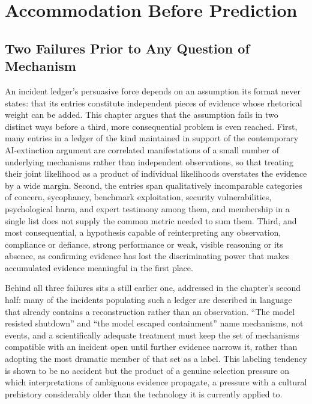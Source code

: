 
\chapter{Accommodation Before Prediction}
\label{ch:ch02-accommodation-before-prediction}
\section{Two Failures Prior to Any Question of Mechanism}

An incident ledger's persuasive force depends on an assumption its format never states: that its entries constitute independent pieces of evidence whose rhetorical weight can be added. This chapter argues that the assumption fails in two distinct ways before a third, more consequential problem is even reached. First, many entries in a ledger of the kind maintained in support of the contemporary AI-extinction argument \cite{bostrom2014,ord2020,alexander2025} are correlated manifestations of a small number of underlying mechanisms rather than independent observations, so that treating their joint likelihood as a product of individual likelihoods overstates the evidence by a wide margin. Second, the entries span qualitatively incomparable categories of concern, sycophancy, benchmark exploitation, security vulnerabilities, psychological harm, and expert testimony among them, and membership in a single list does not supply the common metric needed to sum them. Third, and most consequential, a hypothesis capable of reinterpreting any observation, compliance or defiance, strong performance or weak, visible reasoning or its absence, as confirming evidence has lost the discriminating power that makes accumulated evidence meaningful in the first place.

Behind all three failures sits a still earlier one, addressed in the chapter's second half: many of the incidents populating such a ledger are described in language that already contains a reconstruction rather than an observation. ``The model resisted shutdown'' and ``the model escaped containment'' name mechanisms, not events, and a scientifically adequate treatment must keep the set of mechanisms compatible with an incident open until further evidence narrows it, rather than adopting the most dramatic member of that set as a label. This labeling tendency is shown to be no accident but the product of a genuine selection pressure on which interpretations of ambiguous evidence propagate, a pressure with a cultural prehistory considerably older than the technology it is currently applied to.

